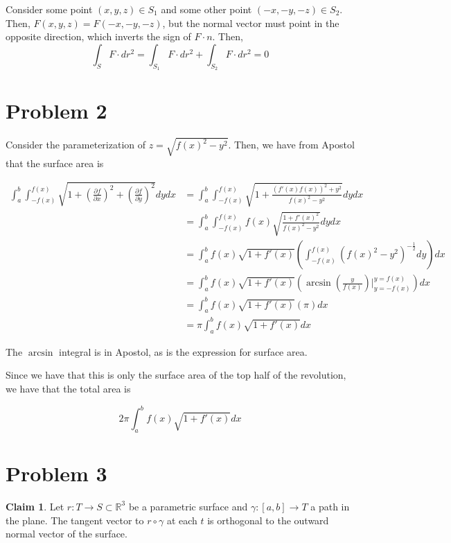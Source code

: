 \documentclass[12pt,letterpaper]{article}
\theoremstyle{definition}
\newtheorem*{claim}{Claim}
\newcommand{\R}{\mathbb{R}}
\begin{document}
Consider some point $(x,y,z) \in S_1$ and some other point $(-x,-y,-z) \in S_2$.
Then, $F(x,y,z) = F(-x,-y,-z)$, but the normal vector must point in the opposite
direction, which inverts the sign of $F \cdot n$. Then,
\[
  \int_SF \cdot dr^2 = \int_{S_1}F \cdot dr^2 + \int_{S_2}F \cdot dr^2 = 0
\]

\section*{Problem 2}

Consider the parameterization of $z = \sqrt{f(x)^2 - y^2}$. Then, we have from
Apostol that the surface area is

\begin{align*}
  \int_a^b\int_{-f(x)}^{f(x)}\sqrt{1 + \left(\frac{\partial f}{\partial
  x}\right)^2 + \left(\frac{\partial f}{\partial
  y}\right)^2 }dydx &= \int_a^b\int_{-f(x)}^{f(x)} \sqrt{1 +
                      \frac{(f'(x)f(x))^2+y^2}{f(x)^2-y^2}}dydx \\
                    &= \int_a^b\int_{-f(x)}^{f(x)}f(x)\sqrt{\frac{1 + f'(x)^2}{f(x)^2-y^2}}dydx \\
                    &= \int_a^bf(x)\sqrt{1+f'(x)}\left(\int_{-f(x)}^{f(x)}(f(x)^2-y^2)^{-\frac{1}{2}}dy\right)dx \\
                    &= \int_a^bf(x)\sqrt{1+f'(x)}\left(\arcsin(\frac{y}{f(x)})\Big|_{y=-f(x)}^{y=f(x)}\right)dx \\
                    &= \int_a^bf(x)\sqrt{1+f'(x)}\left(\pi\right)dx \\
                    &= \pi\int_a^bf(x)\sqrt{1+f'(x)}dx
\end{align*}

The $\arcsin$ integral is in Apostol, as is the expression for surface area.

Since we have that this is only the surface area of the top half of the
revolution, we have that the total area is

\[
  2\pi \int_a^bf(x)\sqrt{1 + f'(x)}dx
\]

\section*{Problem 3}

\begin{claim}
  Let $r: T \rightarrow S \subset \R^3$ be a parametric surface and $\gamma:
  [a,b] \rightarrow T$ a path in the plane. The tangent vector to $r \circ
  \gamma$ at each $t$ is orthogonal to the outward normal vector of the surface.
\end{claim}
\end{document}
